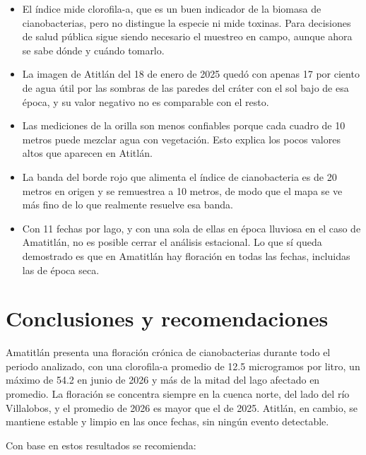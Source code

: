\documentclass[10pt,a4paper]{article}
\begin{document}
\begin{itemize}
  \item El índice mide clorofila-a, que es un buen indicador de la biomasa de cianobacterias, pero no distingue la
  especie ni mide toxinas. Para decisiones de salud pública sigue siendo necesario el muestreo en campo, aunque
  ahora se sabe dónde y cuándo tomarlo.
  \item La imagen de Atitlán del 18 de enero de 2025 quedó con apenas 17 por ciento de agua útil por las sombras de
  las paredes del cráter con el sol bajo de esa época, y su valor negativo no es comparable con el resto.
  \item Las mediciones de la orilla son menos confiables porque cada cuadro de 10 metros puede mezclar agua con
  vegetación. Esto explica los pocos valores altos que aparecen en Atitlán.
  \item La banda del borde rojo que alimenta el índice de cianobacteria es de 20 metros en origen y se remuestrea a
  10 metros, de modo que el mapa se ve más fino de lo que realmente resuelve esa banda.
  \item Con 11 fechas por lago, y con una sola de ellas en época lluviosa en el caso de Amatitlán, no es posible
  cerrar el análisis estacional. Lo que sí queda demostrado es que en Amatitlán hay floración en todas las fechas,
  incluidas las de época seca.
\end{itemize}

\section{Conclusiones y recomendaciones}

Amatitlán presenta una floración crónica de cianobacterias durante todo el periodo analizado, con una clorofila-a
promedio de 12.5 microgramos por litro, un máximo de 54.2 en junio de 2026 y más de la mitad del lago afectado en
promedio. La floración se concentra siempre en la cuenca norte, del lado del río Villalobos, y el promedio de 2026
es mayor que el de 2025. Atitlán, en cambio, se mantiene estable y limpio en las once fechas, sin ningún evento
detectable.

Con base en estos resultados se recomienda:
\end{document}
